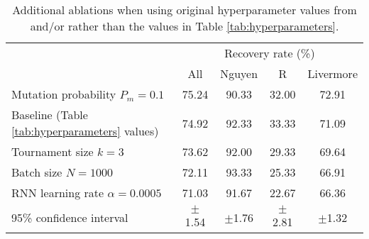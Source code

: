 \documentclass{article}
\begin{document}
\begin{table}[htbp]
  \centering
  \caption{Additional ablations when using original hyperparameter values from \citet{petersen2019deep} and/or \citet{deap2012} rather than the values in Table \ref{tab:hyperparameters}.
  }
    \begin{tabular}{lcccc}
    & \multicolumn{4}{c}{Recovery rate (\%)} \\
    & All & Nguyen & R & Livermore \\
    \cmidrule{2-5}
    Mutation probability $P_m = 0.1$ & 75.24 & 90.33 & 32.00 & 72.91 \\
    Baseline (Table \ref{tab:hyperparameters} values) & 74.92 & 92.33 & 33.33 & 71.09 \\
    Tournament size $k = 3$ & 73.62 & 92.00 & 29.33 & 69.64 \\
    Batch size $N = 1000$ & 72.11 & 93.33 & 25.33 & 66.91 \\
    RNN learning rate $\alpha = 0.0005$ & 71.03 & 91.67 & 22.67 & 66.36 \\
    \midrule
    95\% confidence interval & $\pm$1.54 & $\pm$1.76 & $\pm$2.81 & $\pm$1.32 \\
    \end{tabular}
  \label{tab:extra_ablations}
\end{table}
\end{document}
